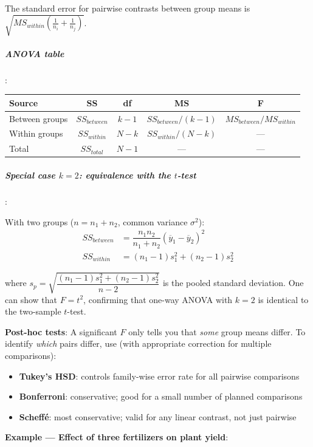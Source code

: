 The standard error for pairwise contrasts between group means is
$\sqrt{MS_{within}\!\left(\tfrac{1}{n_i}+\tfrac{1}{n_j}\right)}$.

\subparagraph{ANOVA table}:

\begin{center}
\begin{tabular}{|l|c|c|c|c|}
    \hline
    \textbf{Source} & \textbf{SS} & \textbf{df} & \textbf{MS} & \textbf{F} \\
    \hline
    Between groups & $SS_{between}$ & $k-1$ & $SS_{between}/(k-1)$ & $MS_{between}/MS_{within}$ \\
    Within groups  & $SS_{within}$  & $N-k$ & $SS_{within}/(N-k)$  & --- \\
    Total          & $SS_{total}$   & $N-1$ & ---                  & --- \\
    \hline
\end{tabular}
\end{center}

\subparagraph{Special case $k=2$: equivalence with the $t$-test}:

With two groups ($n = n_1 + n_2$, common variance $\sigma^2$):
\begin{align*}
    SS_{between} &= \dfrac{n_1 n_2}{n_1+n_2}\left(\overline{y}_1 - \overline{y}_2\right)^2 \\
    SS_{within}  &= (n_1-1)s_1^2 + (n_2-1)s_2^2
\end{align*}

where $s_p = \sqrt{\dfrac{(n_1-1)s_1^2+(n_2-1)s_2^2}{n-2}}$ is the pooled standard
deviation. One can show that $F = t^2$, confirming that one-way ANOVA with $k=2$ is
identical to the two-sample $t$-test.

\textbf{Post-hoc tests}: A significant $F$ only tells you that \emph{some} group means
differ. To identify \emph{which} pairs differ, use (with appropriate correction for
multiple comparisons):
\begin{itemize}
    \item \textbf{Tukey's HSD}: controls family-wise error rate for all pairwise comparisons
    \item \textbf{Bonferroni}: conservative; good for a small number of planned comparisons
    \item \textbf{Scheffé}: most conservative; valid for any linear contrast, not just pairwise
\end{itemize}

\textbf{Example — Effect of three fertilizers on plant yield}:

